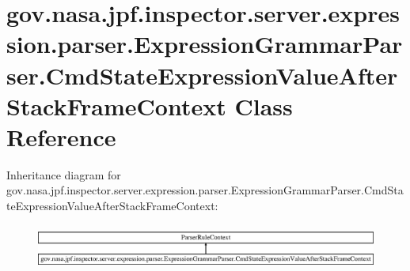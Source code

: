 \hypertarget{classgov_1_1nasa_1_1jpf_1_1inspector_1_1server_1_1expression_1_1parser_1_1_expression_grammar_pa89116a9ed8dad2a185081bb1175595f7}{}\section{gov.\+nasa.\+jpf.\+inspector.\+server.\+expression.\+parser.\+Expression\+Grammar\+Parser.\+Cmd\+State\+Expression\+Value\+After\+Stack\+Frame\+Context Class Reference}
\label{classgov_1_1nasa_1_1jpf_1_1inspector_1_1server_1_1expression_1_1parser_1_1_expression_grammar_pa89116a9ed8dad2a185081bb1175595f7}
Inheritance diagram for gov.\+nasa.\+jpf.\+inspector.\+server.\+expression.\+parser.\+Expression\+Grammar\+Parser.\+Cmd\+State\+Expression\+Value\+After\+Stack\+Frame\+Context\+:\begin{figure}[H]
\begin{center}
\leavevmode
\includegraphics[height=1.519674cm]{classgov_1_1nasa_1_1jpf_1_1inspector_1_1server_1_1expression_1_1parser_1_1_expression_grammar_pa89116a9ed8dad2a185081bb1175595f7}
\end{center}
\end{figure}
